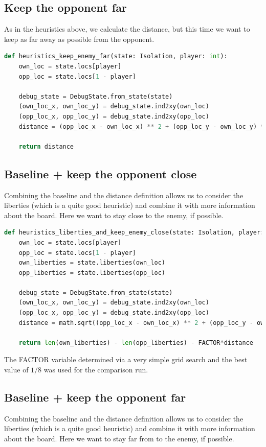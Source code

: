\documentclass[aps,prd,notitlepage,floatfix,superscriptaddress,groupedaddress,nofootinbib]{revtex4-1}
\begin{document}
\subsection*{Keep the opponent far}
As in the heuristics above, we calculate the distance, but this time we want to keep as far away as possible from the opponent.

\begin{lstlisting}[language=python]
def heuristics_keep_enemy_far(state: Isolation, player: int):
    own_loc = state.locs[player]
    opp_loc = state.locs[1 - player]

    debug_state = DebugState.from_state(state)
    (own_loc_x, own_loc_y) = debug_state.ind2xy(own_loc)
    (opp_loc_x, opp_loc_y) = debug_state.ind2xy(opp_loc)
    distance = (opp_loc_x - own_loc_x) ** 2 + (opp_loc_y - own_loc_y) ** 2

    return distance
\end{lstlisting}

\subsection*{Baseline + keep the opponent close}
Combining the baseline and the distance definition allows us to consider the liberties (which is a quite good heuristic) and combine it with more information about the board. Here we want to stay close to the enemy, if possible.

\begin{lstlisting}[language=python]
def heuristics_liberties_and_keep_enemy_close(state: Isolation, player: int):
    own_loc = state.locs[player]
    opp_loc = state.locs[1 - player]
    own_liberties = state.liberties(own_loc)
    opp_liberties = state.liberties(opp_loc)

    debug_state = DebugState.from_state(state)
    (own_loc_x, own_loc_y) = debug_state.ind2xy(own_loc)
    (opp_loc_x, opp_loc_y) = debug_state.ind2xy(opp_loc)
    distance = math.sqrt((opp_loc_x - own_loc_x) ** 2 + (opp_loc_y - own_loc_y) ** 2)

    return len(own_liberties) - len(opp_liberties) - FACTOR*distance
\end{lstlisting}

The FACTOR variable determined via a very simple grid search and the best value of $1/8$ was used for the comparison run.

\subsection*{Baseline + keep the opponent far}
Combining the baseline and the distance definition allows us to consider the liberties (which is a quite good heuristic) and combine it with more information about the board. Here we want to stay far from to the enemy, if possible.
\end{document}
